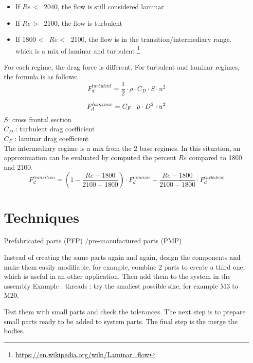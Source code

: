 \documentclass[12pt,a4paper]{article}
\begin{document}
\begin{itemize}
	\item If $Re$ <~ 2040, the flow is still considered laminar 
	\item If $Re$ >~ 2100, the flow is turbulent
	\item If 1800 <~ $Re$ <~ 2100, the flow is in the transition/intermediary range, which is a mix of laminar and turbulent \footnote{\url{https://en.wikipedia.org/wiki/Laminar_flow}}
\end{itemize}

For each regime, the drag force is different. 
For turbulent and laminar regimes, the formula is as follows:
\begin{equation}
	F_d^{turbulent} = \frac{1}{2} \cdot \rho \cdot C_D \cdot S \cdot u^2
\end{equation}

\begin{equation}
	F_d^{laminar} = C_F \cdot \rho \cdot  D^2 \cdot u^2\\
\end{equation}
$S$: cross frontal section\\
$C_D$ : turbulent drag coefficient\\
$C_F$ : laminar drag coefficient\\

The intermediary regime is a mix from the 2 base regimes. In this situation, an approximation can be evaluated by computed the percent $Re$ compared to 1800 and 2100. 
\begin{equation}
	F_d^{transition} = (1- \frac{Re - 1800}{2100-1800}) \cdot F_d^{laminar} + \frac{Re - 1800}{2100-1800} \cdot F_d^{turbulent}
\end{equation}


\newpage
\section{Techniques}
Prefabricated parts (PFP) /pre-manufactured parts (PMP)

Instead of creating the same parts again and again, design the components and make them easily modifiable.
for example, combine 2 parts to create a third one, which is useful in an other application. Then add them to the system in the assembly
Example : threads : try the smallest possible size, for example M3 to M20. 

Test them with small parts and check the tolerances. 
The next step is to prepare small parts ready to be added to system parts. The final step is the merge the bodies. 
\end{document}
